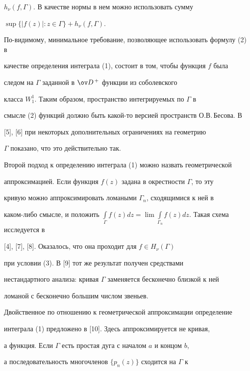 $h_{\nu}(f,\Gamma)$. В качестве нормы в нем можно использовать сумму


$\sup\{| f(z)| : z\in\Gamma\} + h_{\nu}(f,\Gamma)$.





По-видимому, минимальное требование, позволяющее использовать формулу (2) в


качестве определения интеграла (1), состоит в том, чтобы функция $f$ была


следом на $\Gamma$ заданной в $\ov D^{\,+}$ функции из соболевского


класса $W^{1}_{1}$. Таким образом, пространство интегрируемых по $\Gamma$ в


смысле (2) функций должно быть какой-то версией пространств О.В.\,Бесова. В


[5], [6] при некоторых дополнительных ограничениях на геометрию


$\Gamma$ показано, что это действительно так.





Второй подход к определению интеграла (1) можно назвать геометрической


аппроксимацией. Если функция $f(z)$ задана в окрестности $\Gamma$, то эту


кривую можно аппроксимировать ломаными $\Gamma_n$, сходящимися к ней в


каком-либо смысле, и положить $\int\limits_{\Gamma}{f(z)dz} =


\lim \int\limits_{\Gamma_n}{f(z)dz}.$ Такая схема исследуется в


[4], [7], [8]. Оказалось, что она проходит для $f\in H_{\nu}(\Gamma)$


при условии (3). В [9] тот же результат получен средствами


нестандартного анализа: кривая $\Gamma$ заменяется бесконечно близкой к ней


ломаной с бесконечно большим числом звеньев.





Двойственное по отношению к геометрической аппроксимации определение


интеграла (1) предложено в [10]. Здесь аппроксимируется не кривая,


а функция. Если $\Gamma$ есть простая дуга с началом $a$ и концом $b$,


а последовательность многочленов $\{p_n (z)\}$ сходится на $\Gamma$ к


